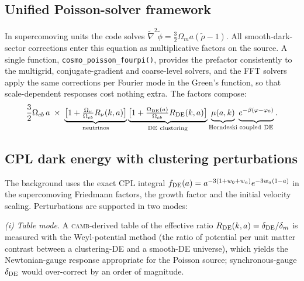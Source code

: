 \documentclass[11pt,a4paper]{article}
\newcommand{\camb}{\textsc{camb}}
\newcommand{\code}[1]{\texttt{#1}}
\begin{document}
\subsection{Unified Poisson-solver framework}
\label{sec:unified}

In supercomoving units the code solves
$\tilde\nabla^2\tilde\phi = \tfrac32\Omega_m a(\tilde\rho-1)$.
All smooth-dark-sector corrections enter this equation as
multiplicative factors on the source. A single function,
\code{cosmo\_poisson\_fourpi()}, provides the prefactor
consistently to the multigrid, conjugate-gradient and coarse-level
solvers, and the FFT solvers apply the same corrections per
Fourier mode in the Green's function, so that scale-dependent
responses cost nothing extra. The factors compose:
\begin{equation}
\frac32\Omega_{cb}\,a
\;\times\;
\underbrace{\bigl[1+\tfrac{\Omega_\nu}{\Omega_{cb}}R_\nu(k,a)\bigr]}_{\rm neutrinos}
\underbrace{\bigl[1+\tfrac{\Omega_{\rm DE}(a)}{\Omega_{cb}}R_{\rm DE}(k,a)\bigr]}_{\rm DE\ clustering}
\underbrace{\vphantom{\bigl[\tfrac00\bigr]}\mu(a,k)}_{\rm Horndeski}
\underbrace{\vphantom{\bigl[\tfrac00\bigr]}e^{-\beta(\varphi-\varphi_0)}}_{\rm coupled\ DE}.
\end{equation}

\subsection{CPL dark energy with clustering perturbations}
\label{sec:cpl}

The background uses the exact CPL integral
$f_{\rm DE}(a)=a^{-3(1+w_0+w_a)}e^{-3w_a(1-a)}$ in the
supercomoving Friedmann factors, the growth factor and the initial
velocity scaling. Perturbations are supported in two modes:

\emph{(i) Table mode.} A \camb-derived table of the effective
ratio $R_{\rm DE}(k,a)=\delta_{\rm DE}/\delta_m$ is measured with
the Weyl-potential method (the ratio of potential per unit matter
contrast between a clustering-DE and a smooth-DE universe), which
yields the Newtonian-gauge response appropriate for the Poisson
source; synchronous-gauge $\delta_{\rm DE}$ would over-correct by
an order of magnitude.
\end{document}
